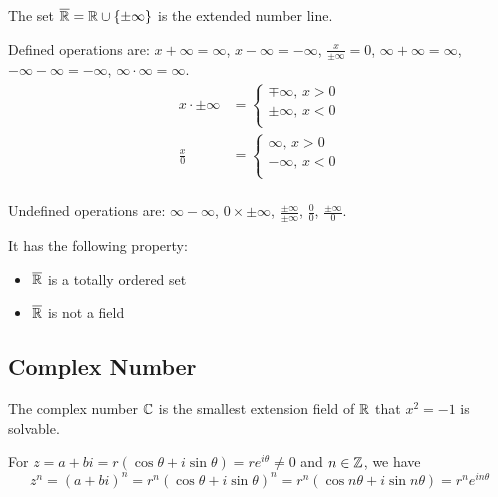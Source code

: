 \begin{definition}
    The set $\overline{\mathbb{R}} = \mathbb{R} \cup \set{\pm \infty}$ is the extended number line. 
    
    Defined operations are: $x + \infty = \infty$, $x - \infty = -\infty$, $\displaystyle \frac{x}{\pm \infty} = 0$, $\infty + \infty = \infty$, $- \infty - \infty = - \infty$, $\infty \cdot \infty = \infty$.
    \begin{equation}
        \begin{aligned}
            x \cdot \pm \infty &= \begin{cases}
                \mp \infty \text{, } x > 0 \\
                \pm \infty \text{, } x < 0 \\
            \end{cases} \\
            \frac{x}{0} &= \begin{cases}
                \infty \text{, } x > 0 \\
                -\infty \text{, } x < 0 \\
            \end{cases} \\
        \end{aligned}
    \end{equation}
    
    Undefined operations are: $\infty - \infty$, $0 \times \pm \infty$, $\displaystyle \frac{\pm \infty}{\pm \infty}$, $\displaystyle \frac{0}{0}$, $\displaystyle \frac{\pm \infty}{0}$.
    
    It has the following property:
    \begin{itemize}
        \item $\overline{\mathbb{R}}$ is a totally ordered set
        \item $\overline{\mathbb{R}}$ is not a field
    \end{itemize}
\end{definition}

\subsection{Complex Number}

The complex number $\mathbb{C}$ is the smallest extension field of $\mathbb{R}$ that $x^2 = -1$ is solvable.

\begin{theorem}
    For $z = a + b i = r(\cos \theta + i \sin \theta) = r e^{i \theta} \neq 0$ and $n \in \mathbb{Z}$, we have 
    \begin{equation}
        z^n = (a+bi)^n = r^n(\cos \theta + i \sin \theta)^n = r^n (\cos n\theta + i \sin n\theta) = r^n e^{in\theta}
    \end{equation}
\end{theorem}

